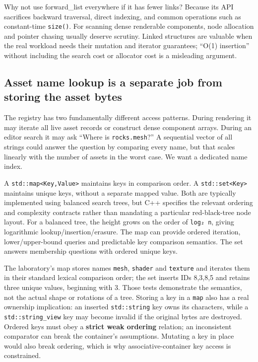 Why not use forward\_list everywhere if it has fewer links? Because its API sacrifices backward traversal, direct indexing, and common operations such as constant-time \texttt{size()}. For scanning dense renderable components, node allocation and pointer chasing usually deserve scrutiny. Linked structures are valuable when the real workload needs their mutation and iterator guarantees; ``O(1) insertion'' without including the search cost or allocator cost is a misleading argument.

\subsection{Asset name lookup is a separate job from storing the asset bytes}\label{05-engine-i-ch005-asset-name-lookup-is-a-separate-job-from-storing-the-asset-bytes}

The registry has two fundamentally different access patterns. During rendering it may iterate all live asset records or construct dense component arrays. During an editor search it may ask ``Where is \texttt{rocks.mesh}?'' A sequential vector of all strings could answer the question by comparing every name, but that scales linearly with the number of assets in the worst case. We want a dedicated name index.

A \texttt{std::map\textless{}Key,Value\textgreater{}} maintains keys in comparison order. A \texttt{std::set\textless{}Key\textgreater{}} maintains unique keys, without a separate mapped value. Both are typically implemented using balanced search trees, but C++ specifies the relevant ordering and complexity contracts rather than mandating a particular red-black-tree node layout. For a balanced tree, the height grows on the order of \texttt{log₂\ n}, giving logarithmic lookup/insertion/erasure. The map can provide ordered iteration, lower/upper-bound queries and predictable key comparison semantics. The set answers membership questions with ordered unique keys.

The laboratory's map stores names \texttt{mesh}, \texttt{shader} and \texttt{texture} and iterates them in their standard lexical comparison order; the set inserts IDs 8,3,8,5 and retains three unique values, beginning with 3. Those tests demonstrate the semantics, not the actual shape or rotations of a tree. Storing a key in a \texttt{map} also has a real ownership implication: an inserted \texttt{std::string} key owns its characters, while a \texttt{std::string\_view} key may become invalid if the original bytes are destroyed. Ordered keys must obey a \textbf{strict weak ordering} relation; an inconsistent comparator can break the container's assumptions. Mutating a key in place would also break ordering, which is why associative-container key access is constrained.

